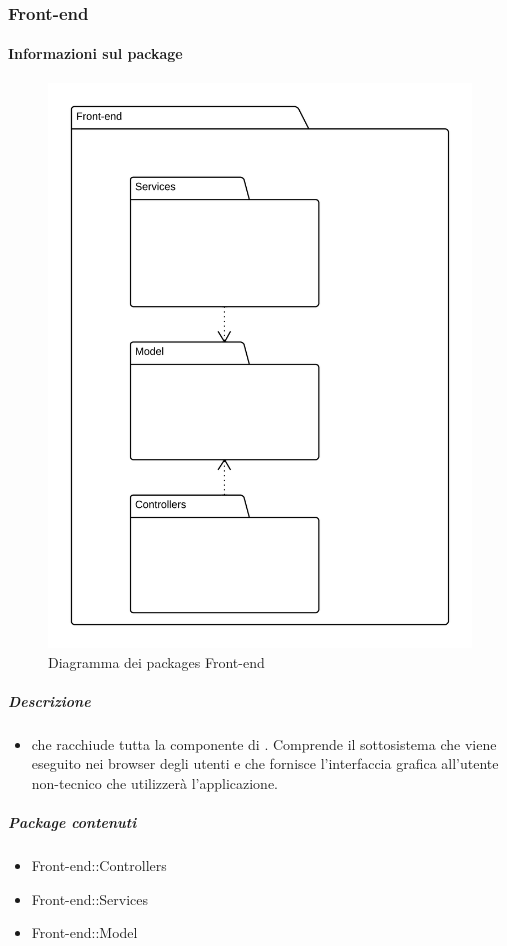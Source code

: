 
  \subsubsection{Front-end}
  \paragraph{Informazioni sul package}
    \begin{figure}[H] 
      \begin{center} 
        \includegraphics[scale=0.18]{uml/Front-end-Diagramma dei packages.png}  
        \caption{Diagramma dei packages Front-end}
      \end{center}  
    \end{figure} 
  \subparagraph{Descrizione} 
    \begin{itemize}
    \item[]  che racchiude tutta la componente di . Comprende il sottosistema che viene eseguito nei browser degli utenti e che fornisce l'interfaccia grafica all'utente non-tecnico che utilizzerà l'applicazione.
    \end{itemize} 
    \subparagraph{Package contenuti} 
    \begin{itemize}
        \item Front-end::Controllers
        \item Front-end::Services
        \item Front-end::Model
    \end{itemize}
    
